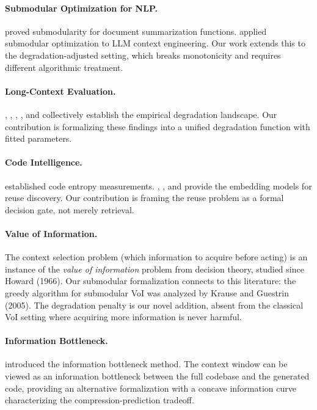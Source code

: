 \documentclass[11pt, a4paper, logo, copyright]{googledeepmind}
\begin{document}
\paragraph{Submodular Optimization for NLP.} \citet{lin2011submodular} proved submodularity for document summarization functions. \citet{jina2025submodular} applied submodular optimization to LLM context engineering. Our work extends this to the degradation-adjusted setting, which breaks monotonicity and requires different algorithmic treatment.

\paragraph{Long-Context Evaluation.} \citet{liu2024lost}, \citet{chroma2025contextrot}, \citet{du2025context}, \citet{kuratov2024babilong}, and \citet{hsieh2024ruler} collectively establish the empirical degradation landscape. Our contribution is formalizing these findings into a unified degradation function with fitted parameters.

\paragraph{Code Intelligence.} \citet{hindle2012naturalness} established code entropy measurements. \citet{feng2020codebert}, \citet{guo2022unixcoder}, and \citet{wang2023codet5plus} provide the embedding models for reuse discovery. Our contribution is framing the reuse problem as a formal decision gate, not merely retrieval.

\paragraph{Value of Information.} The context selection problem (which information to acquire before acting) is an instance of the \emph{value of information} problem from decision theory, studied since Howard (1966). Our submodular formalization connects to this literature: the greedy algorithm for submodular VoI was analyzed by Krause and Guestrin (2005). The degradation penalty is our novel addition, absent from the classical VoI setting where acquiring more information is never harmful.

\paragraph{Information Bottleneck.} \citet{tishby2000information} introduced the information bottleneck method. The context window can be viewed as an information bottleneck between the full codebase and the generated code, providing an alternative formalization with a concave information curve characterizing the compression-prediction tradeoff.
\end{document}
